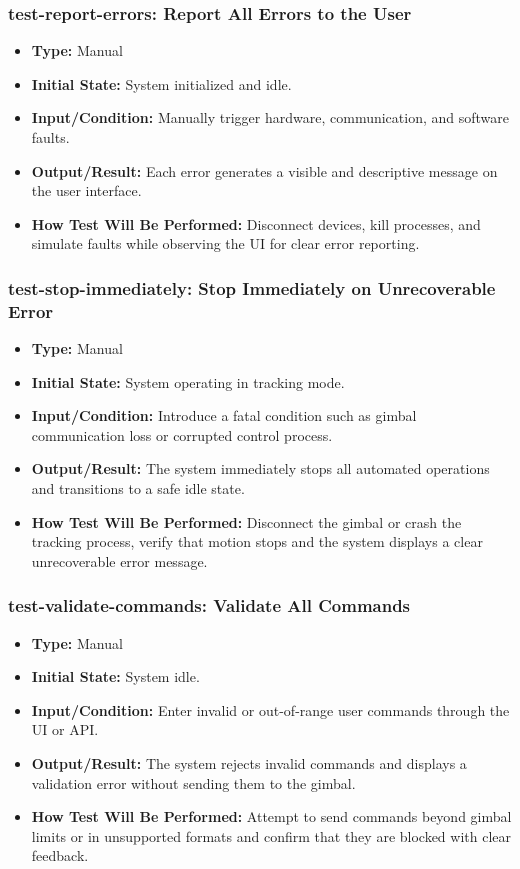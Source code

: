 \documentclass[12pt, titlepage]{article}
\begin{document}
\subsubsection*{test-report-errors: Report All Errors to the User}
\begin{itemize}
  \item \textbf{Type:} Manual
  \item \textbf{Initial State:} System initialized and idle.
  \item \textbf{Input/Condition:} Manually trigger hardware, communication, and software faults.
  \item \textbf{Output/Result:} Each error generates a visible and descriptive message on the user interface.
  \item \textbf{How Test Will Be Performed:} Disconnect devices, kill processes, and simulate faults while observing the UI for clear error reporting.
\end{itemize}

\subsubsection*{test-stop-immediately: Stop Immediately on Unrecoverable Error}
\begin{itemize}
  \item \textbf{Type:} Manual
  \item \textbf{Initial State:} System operating in tracking mode.
  \item \textbf{Input/Condition:} Introduce a fatal condition such as gimbal communication loss or corrupted control process.
  \item \textbf{Output/Result:} The system immediately stops all automated operations and transitions to a safe idle state.
  \item \textbf{How Test Will Be Performed:} Disconnect the gimbal or crash the tracking process, verify that motion stops and the system displays a clear unrecoverable error message.
\end{itemize}

\subsubsection*{test-validate-commands: Validate All Commands}
\begin{itemize}
  \item \textbf{Type:} Manual
  \item \textbf{Initial State:} System idle.
  \item \textbf{Input/Condition:} Enter invalid or out-of-range user commands through the UI or API.
  \item \textbf{Output/Result:} The system rejects invalid commands and displays a validation error without sending them to the gimbal.
  \item \textbf{How Test Will Be Performed:} Attempt to send commands beyond gimbal limits or in unsupported formats and confirm that they are blocked with clear feedback.
\end{itemize}
\end{document}
